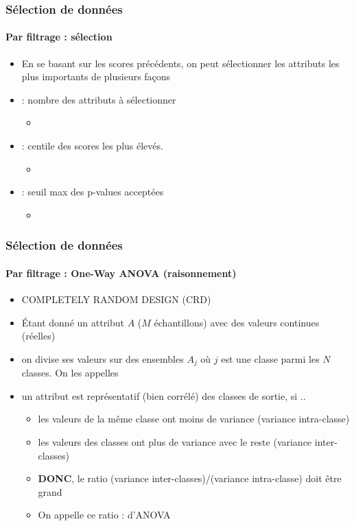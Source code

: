 \documentclass[xcolor=table]{beamer}
\begin{document}
\begin{frame}
	\frametitle{Sélection de données}
	\framesubtitle{Par filtrage : sélection}
	
	\begin{itemize}
		\item En se basant sur les scores précédents, on peut sélectionner les attributs les plus importants de plusieurs façons
		\item {} : nombre des attributs à sélectionner
		\begin{itemize}
			\item {}
		\end{itemize}
		\item {} : centile des scores les plus élevés.
		\begin{itemize}
			\item {}
		\end{itemize}
		\item {} : seuil max des p-values acceptées
		\begin{itemize}
			\item {}
		\end{itemize}
	\end{itemize}
	
\end{frame}

\begin{frame}
	\frametitle{Sélection de données}
	\framesubtitle{Par filtrage : One-Way ANOVA (raisonnement)}
	
	\begin{itemize}
		\item COMPLETELY RANDOM DESIGN (CRD) 
		\item Étant donné un attribut $A$ ($M$ échantillons) avec des valeurs continues (réelles)
		\item on divise ses valeurs sur des ensembles $A_j$ où $j$ est une classe parmi les $N$ classes. On les appelles 
		\item un attribut est représentatif (bien corrélé) des classes de sortie, si ..
		\begin{itemize}
			\item les valeurs de la même classe ont moins de variance (variance intra-classe)
			\item les valeurs des classes ont plus de variance avec le reste (variance inter-classes)
			\item \textbf{DONC}, le ratio (variance inter-classes)/(variance intra-classe) doit être grand
			\item On appelle ce ratio :  d'ANOVA
		\end{itemize}
	\end{itemize}
	
\end{frame}
\end{document}
